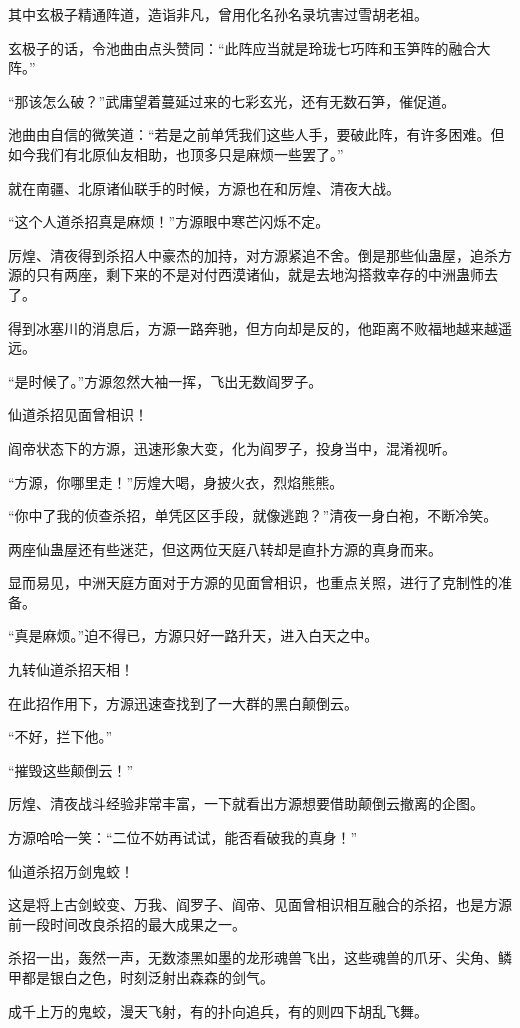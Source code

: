\begin{this_body}
其中玄极子精通阵道，造诣非凡，曾用化名孙名录坑害过雪胡老祖。

玄极子的话，令池曲由点头赞同：“此阵应当就是玲珑七巧阵和玉笋阵的融合大阵。”

“那该怎么破？”武庸望着蔓延过来的七彩玄光，还有无数石笋，催促道。

池曲由自信的微笑道：“若是之前单凭我们这些人手，要破此阵，有许多困难。但如今我们有北原仙友相助，也顶多只是麻烦一些罢了。”

就在南疆、北原诸仙联手的时候，方源也在和厉煌、清夜大战。

“这个人道杀招真是麻烦！”方源眼中寒芒闪烁不定。

厉煌、清夜得到杀招人中豪杰的加持，对方源紧追不舍。倒是那些仙蛊屋，追杀方源的只有两座，剩下来的不是对付西漠诸仙，就是去地沟搭救幸存的中洲蛊师去了。

得到冰塞川的消息后，方源一路奔驰，但方向却是反的，他距离不败福地越来越遥远。

“是时候了。”方源忽然大袖一挥，飞出无数阎罗子。

仙道杀招见面曾相识！

阎帝状态下的方源，迅速形象大变，化为阎罗子，投身当中，混淆视听。

“方源，你哪里走！”厉煌大喝，身披火衣，烈焰熊熊。

“你中了我的侦查杀招，单凭区区手段，就像逃跑？”清夜一身白袍，不断冷笑。

两座仙蛊屋还有些迷茫，但这两位天庭八转却是直扑方源的真身而来。

显而易见，中洲天庭方面对于方源的见面曾相识，也重点关照，进行了克制性的准备。

“真是麻烦。”迫不得已，方源只好一路升天，进入白天之中。

九转仙道杀招天相！

在此招作用下，方源迅速查找到了一大群的黑白颠倒云。

“不好，拦下他。”

“摧毁这些颠倒云！”

厉煌、清夜战斗经验非常丰富，一下就看出方源想要借助颠倒云撤离的企图。

方源哈哈一笑：“二位不妨再试试，能否看破我的真身！”

仙道杀招万剑鬼蛟！

这是将上古剑蛟变、万我、阎罗子、阎帝、见面曾相识相互融合的杀招，也是方源前一段时间改良杀招的最大成果之一。

杀招一出，轰然一声，无数漆黑如墨的龙形魂兽飞出，这些魂兽的爪牙、尖角、鳞甲都是银白之色，时刻泛射出森森的剑气。

成千上万的鬼蛟，漫天飞射，有的扑向追兵，有的则四下胡乱飞舞。


\end{this_body}
